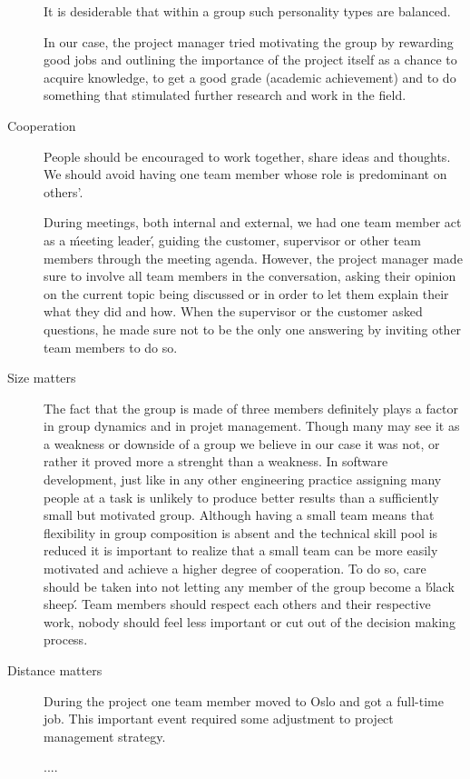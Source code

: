 \begin{description}
It is desiderable that within a group such personality types are balanced.

In our case, the project manager tried motivating the group by rewarding good jobs
and outlining the importance of the project itself as a chance to acquire knowledge,
to get a good grade (academic achievement) and to do something that stimulated further
research and work in the field.

\item[Cooperation]
People should be encouraged to work together, share ideas and thoughts.
We should avoid having one team member whose role is predominant on others'.

During meetings, both internal and external, we had one team member
act as a \'meeting leader\', guiding the customer, supervisor or other team members through
the meeting agenda. However, the project manager made sure to involve all team members
in the conversation, asking their opinion on the current topic being discussed
or in order to let them explain their what they did and how.
When the supervisor or the customer asked questions, he made sure not to be the only one
answering by inviting other team members to do so.

\item[Size matters]
The fact that the group is made of three members definitely plays a factor in group dynamics
and in projet management. Though many may see it as a weakness or downside of a group we believe
in our case it was not, or rather it proved more a strenght than a weakness.
In software development, just like in any other engineering practice assigning many people
at a task is unlikely to produce better results than a sufficiently small but motivated group.
Although having a small team means that flexibility in group composition is absent and
the technical skill pool is reduced it is important to realize that a small team
can be more easily motivated and achieve a higher degree of cooperation.
To do so, care should be taken into not letting any member of the group become
a \'black sheep\'. Team members should respect each others and their respective work,
nobody should feel less important or cut out of the decision making process.

\item[Distance matters]
During the project one team member moved to Oslo and got a full-time job.
This important event required some adjustment to project management strategy.

....



\end{description}


